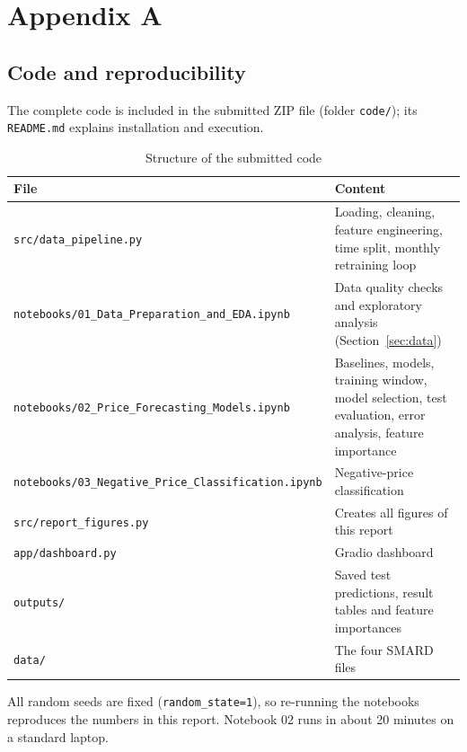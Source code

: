 \documentclass[12pt,oneside]{article}
\begin{document}
\clearpage
\lhead{}
\printbibliography
{}


\clearpage
\appendix
\section{Appendix A}

\subsection*{Code and reproducibility}

The complete code is included in the submitted ZIP file (folder \texttt{code/}); its \texttt{README.md} explains installation and execution.

\begin{table}[!htbp]
    \centering
    \caption{Structure of the submitted code}
    \begin{tabularx}{\textwidth}{lX}
        \toprule
        File & Content \\
        \midrule
        \texttt{src/data\_pipeline.py} & Loading, cleaning, feature engineering, time split, monthly retraining loop \\
        \texttt{notebooks/01\_Data\_Preparation\_and\_EDA.ipynb} & Data quality checks and exploratory analysis (Section~\ref{sec:data}) \\
        \texttt{notebooks/02\_Price\_Forecasting\_Models.ipynb} & Baselines, models, training window, model selection, test evaluation, error analysis, feature importance \\
        \texttt{notebooks/03\_Negative\_Price\_Classification.ipynb} & Negative-price classification \\
        \texttt{src/report\_figures.py} & Creates all figures of this report \\
        \texttt{app/dashboard.py} & Gradio dashboard \\
        \texttt{outputs/} & Saved test predictions, result tables and feature importances \\
        \texttt{data/} & The four SMARD files \\
        \bottomrule
    \end{tabularx}
    \label{tab:code}
\end{table}

All random seeds are fixed (\texttt{random\_state=1}), so re-running the notebooks reproduces the numbers in this report. Notebook 02 runs in about 20 minutes on a standard laptop.


\end{document}
